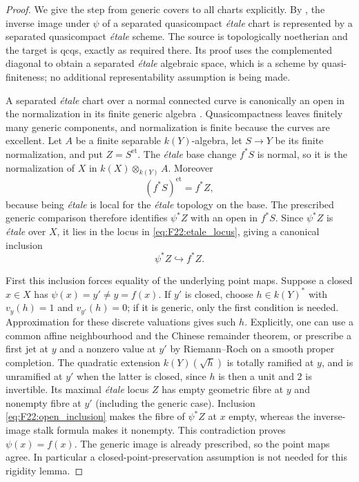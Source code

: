 \begin{proof}
We give the step from generic covers to all charts explicitly.
By \citet[Theorem~A.8 and Corollary~A.9]{F_CHW2024}, the inverse
image under $\psi$ of a separated quasicompact \emph{\'etale}
chart is represented by a separated quasicompact \emph{\'etale}
scheme. The source is topologically noetherian and the target
is qcqs, exactly as required there. Its proof uses the
complemented diagonal to obtain a separated \emph{\'etale}
algebraic space, which is a scheme by quasi-finiteness; no
additional representability assumption is being made.

A separated \emph{\'etale} chart over a normal connected curve
is canonically an open in the normalization in its finite generic
algebra \citep[Expos\'e~I, Proposition~10.1]{F_SGA1}.
Quasicompactness leaves finitely many generic components, and
normalization is finite because the curves are excellent. Let
$A$ be a finite separable $k(Y)$-algebra, let $S\to Y$ be its
finite normalization, and put $Z=S^{\mathrm{et}}$. The
\emph{\'etale} base change $f^*S$ is normal, so it is the
normalization of $X$ in $k(X)\otimes_{k(Y)}A$. Moreover
\begin{equation}\label{eq:F22:etale_locus}
 (f^*S)^{\mathrm{et}}=f^*Z,
\end{equation}
because being \emph{\'etale} is local for the \emph{\'etale}
topology on the base. The prescribed generic comparison
therefore identifies $\psi^*Z$ with an open in $f^*S$.
Since $\psi^*Z$ is \emph{\'etale} over $X$, it lies in the
locus in \eqref{eq:F22:etale_locus}, giving a canonical inclusion
\begin{equation}\label{eq:F22:open_inclusion}
 \psi^*Z\hookrightarrow f^*Z.
\end{equation}

First this inclusion forces equality of the underlying point
maps. Suppose a closed $x\in X$ has
$\psi(x)=y'\ne y=f(x)$. If $y'$ is closed, choose
$h\in k(Y)^*$ with $v_y(h)=1$ and $v_{y'}(h)=0$; if it is
generic, only the first condition is needed. Approximation for
these discrete valuations gives such $h$. Explicitly, one can
use a common affine neighbourhood and the Chinese remainder
theorem, or prescribe a first jet at $y$ and a nonzero value at
$y'$ by Riemann--Roch on a smooth proper completion. The quadratic
extension $k(Y)(\sqrt h)$ is totally ramified at $y$, and is
unramified at $y'$ when the latter is closed, since $h$ is then
a unit and $2$ is invertible. Its maximal \emph{\'etale} locus
$Z$ has empty geometric fibre at $y$ and nonempty fibre at
$y'$ (including the generic case). Inclusion
\eqref{eq:F22:open_inclusion} makes the fibre of $\psi^*Z$ at
$x$ empty, whereas the inverse-image stalk formula makes it
nonempty. This contradiction proves $\psi(x)=f(x)$.
The generic image is already prescribed, so the point maps agree.
In particular a closed-point-preservation assumption is not
needed for this rigidity lemma.


\end{proof}
